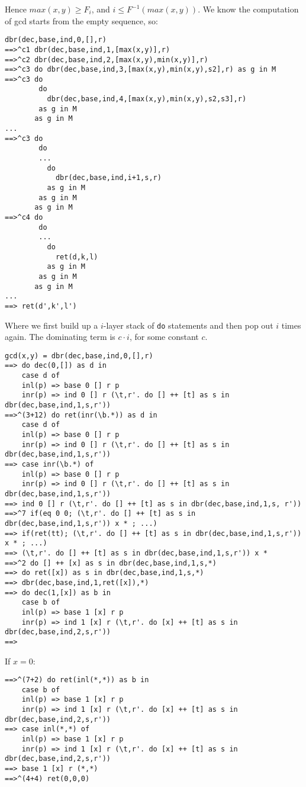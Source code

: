Hence $max(x,y) \ge F_i$, and $i \le F^{-1}(max(x,y))$. We know the computation of gcd 
starts from the empty sequence, so:

\begin{verbatim}
dbr(dec,base,ind,0,[],r)
==>^c1 dbr(dec,base,ind,1,[max(x,y)],r) 
==>^c2 dbr(dec,base,ind,2,[max(x,y),min(x,y)],r) 
==>^c3 do dbr(dec,base,ind,3,[max(x,y),min(x,y),s2],r) as g in M
==>^c3 do 
        do 
          dbr(dec,base,ind,4,[max(x,y),min(x,y),s2,s3],r) 
        as g in M
       as g in M
...
==>^c3 do 
        do 
        ...
          do
            dbr(dec,base,ind,i+1,s,r) 
          as g in M
        as g in M
       as g in M
==>^c4 do 
        do 
        ...
          do
            ret(d,k,l)
          as g in M
        as g in M
       as g in M
...
==> ret(d',k',l')
\end{verbatim}

Where we first build up a $i$-layer stack of \texttt{do} statements and then 
pop out $i$ times again. The dominating term is $c\cdot i$, for some constant $c$.


\begin{verbatim}
gcd(x,y) = dbr(dec,base,ind,0,[],r) 
==> do dec(0,[]) as d in 
    case d of
    inl(p) => base 0 [] r p 
    inr(p) => ind 0 [] r (\t,r'. do [] ++ [t] as s in dbr(dec,base,ind,1,s,r')) 
==>^(3+12) do ret(inr(\b.*)) as d in 
    case d of
    inl(p) => base 0 [] r p 
    inr(p) => ind 0 [] r (\t,r'. do [] ++ [t] as s in dbr(dec,base,ind,1,s,r')) 
==> case inr(\b.*) of
    inl(p) => base 0 [] r p 
    inr(p) => ind 0 [] r (\t,r'. do [] ++ [t] as s in dbr(dec,base,ind,1,s,r')) 
==> ind 0 [] r (\t,r'. do [] ++ [t] as s in dbr(dec,base,ind,1,s, r')) 
==>^7 if(eq 0 0; (\t,r'. do [] ++ [t] as s in dbr(dec,base,ind,1,s,r')) x * ; ...)
==> if(ret(tt); (\t,r'. do [] ++ [t] as s in dbr(dec,base,ind,1,s,r')) x * ; ...)
==> (\t,r'. do [] ++ [t] as s in dbr(dec,base,ind,1,s,r')) x * 
==>^2 do [] ++ [x] as s in dbr(dec,base,ind,1,s,*)
==> do ret([x]) as s in dbr(dec,base,ind,1,s,*)
==> dbr(dec,base,ind,1,ret([x]),*)
==> do dec(1,[x]) as b in 
    case b of
    inl(p) => base 1 [x] r p
    inr(p) => ind 1 [x] r (\t,r'. do [x] ++ [t] as s in dbr(dec,base,ind,2,s,r')) 
==> 
\end{verbatim}

If $x = 0$:
\begin{verbatim}
==>^(7+2) do ret(inl(*,*)) as b in 
    case b of
    inl(p) => base 1 [x] r p
    inr(p) => ind 1 [x] r (\t,r'. do [x] ++ [t] as s in dbr(dec,base,ind,2,s,r')) 
==> case inl(*,*) of 
    inl(p) => base 1 [x] r p
    inr(p) => ind 1 [x] r (\t,r'. do [x] ++ [t] as s in dbr(dec,base,ind,2,s,r')) 
==> base 1 [x] r (*,*)
==>^(4+4) ret(0,0,0)
\end{verbatim}

